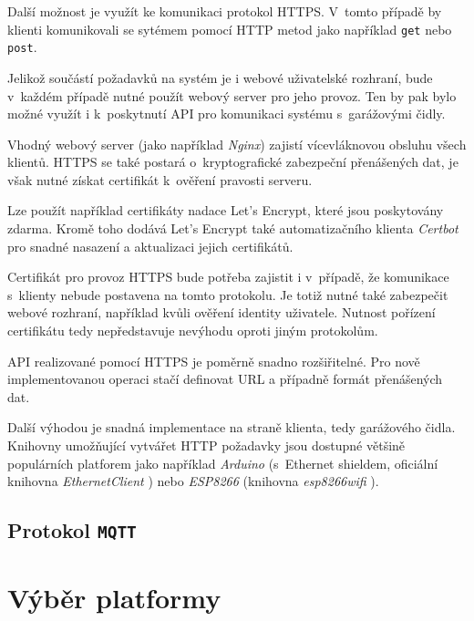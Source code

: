 \documentclass[thesis=M,czech]{FITthesis}[2012/06/26]
\begin{document}
Další možnost je využít ke komunikaci protokol HTTPS. V~tomto případě by klienti komunikovali se sytémem pomocí HTTP metod jako například \verb|get| nebo \verb|post|.

Jelikož součástí požadavků na systém je i webové uživatelské rozhraní, bude v~každém případě nutné použít webový server pro jeho provoz. Ten by pak bylo možné využít i k~poskytnutí API pro komunikaci systému s~garážovými čidly.

Vhodný webový server (jako například \textit{Nginx}) zajistí vícevláknovou obsluhu všech klientů. HTTPS se také postará o~kryptografické zabezpeční přenášených dat, je však nutné získat certifikát k~ověření pravosti serveru. 

Lze použít například certifikáty nadace Let's Encrypt, které jsou poskytovány  zdarma. Kromě toho dodává Let's Encrypt také automatizačního klienta \textit{Certbot} \cite{certbot} pro snadné nasazení a aktualizaci jejich certifikátů.

Certifikát pro provoz HTTPS bude potřeba zajistit i v~případě, že komunikace s~klienty nebude postavena na tomto protokolu. Je totiž nutné také zabezpečit webové rozhraní, například kvůli ověření identity uživatele. Nutnost pořízení certifikátu tedy nepředstavuje nevýhodu oproti jiným protokolům.

API realizované pomocí HTTPS je poměrně snadno rozšiřitelné. Pro nově implementovanou operaci stačí definovat URL a případně formát přenášených dat.

Další výhodou je snadná implementace na straně klienta, tedy garážového čidla. Knihovny umožňující vytvářet HTTP požadavky jsou dostupné většině populárních platforem jako například \textit{Arduino} (s~Ethernet shieldem, oficiální knihovna \textit{EthernetClient} \cite{ard_web}) nebo \textit{ESP8266} (knihovna \textit{esp8266wifi} \cite{esp_web}).


\subsection{Protokol \texttt{MQTT}}

\section{Výběr platformy}
\end{document}
